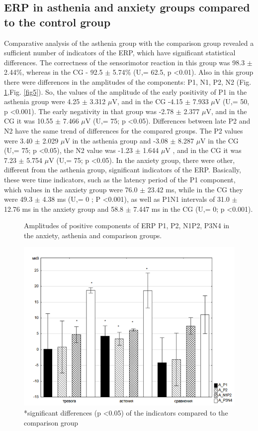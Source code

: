 \documentclass[twocolumn]{article}
\begin{document}
\subsection{ERP in asthenia and anxiety groups compared to the control group }
\par Comparative analysis of the asthenia group with the comparison group revealed a sufficient number of indicators of the ERP, which have significant statistical differences. The correctness of the sensorimotor reaction in this group was 98.3 $\pm$ 2.44\%, whereas in the CG - 92.5 $\pm$ 5.74\% (U\cite{bib15},\cite{bib20}= 62.5, p \textless{}0.01). Also in this group there were differences in the amplitudes of the components: P1, N1, P2, N2 (Fig. \ref{fig4},Fig. \ref{fig5}). So, the values of the amplitude of the early positivity of P1 in the asthenia group were 4.25 $\pm$ 3.312 $\mu$V, and in the CG -4.15 $\pm$ 7.933 $\mu$V (U\cite{bib15},\cite{bib20}= 50, p \textless{}0.001). The early negativity in that group was -2.78 $\pm$ 2.377 $\mu$V, and in the CG it was 10.55 $\pm$ 7.466 $\mu$V (U\cite{bib15},\cite{bib20}= 75; p \textless{}0.05). Differences between late P2 and N2 have the same trend of differences for the compared groups. The P2 values were 3.40 $\pm$ 2.029 $\mu$V in the asthenia group and -3.08 $\pm$ 8.287 $\mu$V in the CG (U\cite{bib15},\cite{bib20}= 75; p \textless{}0.05), the N2 value was -1.23 $\pm$ 1.644 $\mu$V , and in the CG it was 7.23 $\pm$ 5.754 $\mu$V (U\cite{bib15},\cite{bib20}= 75; p \textless{}0.05). In the anxiety group, there were other, different from the asthenia group, significant indicators of the ERP. Basically, these were time indicators, such as the latency period of the P1 component, which values in the anxiety group were 76.0 $\pm$ 23.42 ms, while in the CG they were 49.3 $\pm$ 4.38 ms (U\cite{bib15},\cite{bib20}= 0 ; P \textless{}0.001), as well as P1N1 intervals of 31.0 $\pm$ 12.76 ms in the anxiety group and 58.8 $\pm$ 7.447 ms in the CG (U\cite{bib15},\cite{bib20}= 0; p \textless{}0.001).
\begin{figure}
\caption{Amplitudes of positive components of ERP P1, P2, N1P2, P3N4 in the anxiety, asthenia and comparison groups.}
\label{fig4}
\includegraphics[width=\linewidth ]{fig4.png}
\caption*{*significant differences (p \textless{}0.05) of the indicators compared to the comparison group}
\end{figure}
\end{document}
